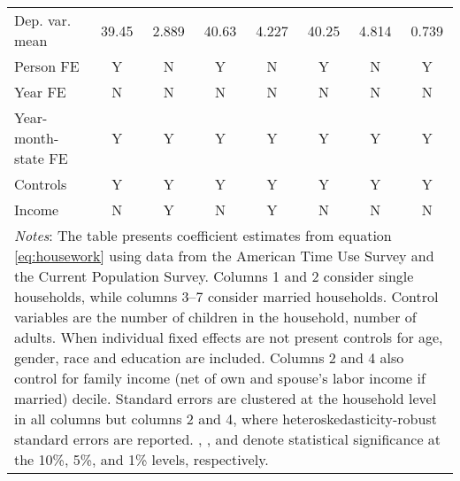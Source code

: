 {\begin{tabular}{l*{7}{c}}
Dep. var. mean      &       39.45         &       2.889         &       40.63         &       4.227         &       40.25         &       4.814         &       0.739         \\
Person FE           &           Y         &           N         &           Y         &           N         &           Y         &           N         &           Y         \\
Year FE             &           N         &           N         &           N         &           N         &           N         &           N         &           N         \\
Year-month-state FE &           Y         &           Y         &           Y         &           Y         &           Y         &           Y         &           Y         \\
Controls            &           Y         &           Y         &           Y         &           Y         &           Y         &           Y         &           Y         \\
Income              &           N         &           Y         &           N         &           Y         &           N         &           N         &           N         \\
\bottomrule
\multicolumn{8}{p{17cm}}{\footnotesize \textit{Notes}: The table presents coefficient estimates from equation \ref{eq:housework} using data from the American Time Use Survey and the Current Population Survey. Columns 1 and 2 consider single households, while columns 3--7 consider married households. Control variables are the number of children in the household, number of adults. When individual fixed effects are not present controls for age, gender, race and education are included. Columns 2 and 4 also control for family income (net of own and spouse's labor income if married) decile. Standard errors are clustered at the household level in all columns but columns 2 and 4, where heteroskedasticity-robust standard errors are reported. \sym{*}, \sym{**}, and \sym{***} denote statistical significance at the 10\%, 5\%, and 1\% levels, respectively.}\\
\end{tabular}
}
